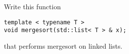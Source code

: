Write this function
\begin{Verbatim}[frame=single]
template < typename T >
void mergesort(std::list< T > & x);
\end{Verbatim}
that performs mergesort on linked lists.
